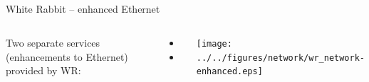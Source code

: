 \documentclass[compress,red]{beamer}
\begin{document}
\subsection{}
\begin{frame}{White Rabbit -- enhanced Ethernet}


\begin{columns}[c]
 
  Two separate services (enhancements to Ethernet) provided by WR: 
  \begin{itemize}
    \item \color{blue!90}{High accuracy/precision synchronization}
    \item \color{red}{Deterministic, reliable and low-latency Control Data delivery}
  \end{itemize}

    \begin{center}
    \texttt{[image: ../../figures/network/wr\_network-enhanced.eps]}
    \end{center}
\end{columns}

\end{frame}
\end{document}
